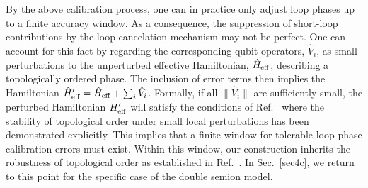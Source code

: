 \documentclass[twocolumn,floats,prx,showpacs]{revtex4-1}
\newcommand{\rein}[1]{{\color{rein} #1}}
\begin{document}
\rein{By the above calibration process, one can in practice only adjust loop phases up to a finite accuracy window. 
As a consequence, the suppression of short-loop contributions by the loop cancelation mechanism may not be perfect.
One can account for this fact by regarding the corresponding qubit operators, $\hat V_i$, as small perturbations to the unperturbed effective Hamiltonian, 
$\hat H_{\rm eff}$,  describing  a topologically ordered phase.
The inclusion of error terms then implies the Hamiltonian 
$\hat H_{\rm eff}'= \hat H_{\rm eff} + \sum_i \hat V_i$.
Formally, if all $ \|\hat V_{i} \|$ are sufficiently small, the perturbed Hamiltonian
$H'_{\rm eff}$  will satisfy the conditions of Ref.~\cite{1001.0344} where the stability of topological order under small local
perturbations has been demonstrated explicitly.  This implies that a finite window for tolerable loop phase calibration errors must exist. Within this window, our construction inherits the 
robustness of topological order as established in Ref.~\cite{1001.0344}.  In Sec.~\ref{sec4c}, we return to this 
point for the specific case of the double semion model. }
\end{document}
